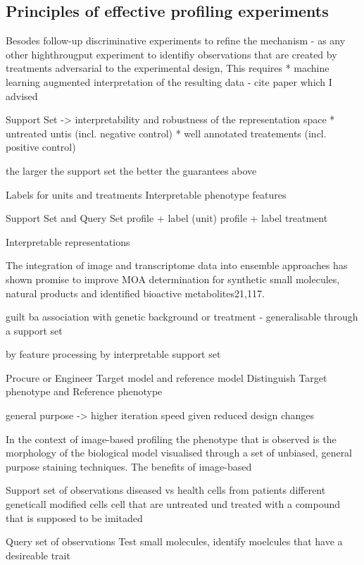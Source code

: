 \begin{flushleft}
\subsection{Principles of effective profiling experiments}

Besodes follow-up discriminative experiments to refine the mechanism - as any other highthrougput experiment to identifiy observations that are created by treatments adversarial to the experimental design, This requires 
* machine learning augmented interpretation of the resulting data - cite paper which I advised

Support Set -> interpretability and robustness of the representation space
* untreated untis (incl. negative control)
* well annotated treatements (incl. positive control)

the larger the support set the better the guarantees above



Labels for units and treatments
Interpretable phenotype features

Support Set and Query Set
profile + label (unit)
profile + label treatment

Interpretable representations

The integration of image and transcriptome data into ensemble approaches has shown promise to improve MOA determination for synthetic small molecules, natural products and identified bioactive metabolites21,117.

guilt ba association with genetic background or treatment - generalisable through a support set 

by feature processing 
by interpretable support set

Procure or Engineer Target model and reference model
Distinguish Target phenotype and Reference phenotype


general purpose -> higher iteration speed given reduced design changes





In the context of image-based profiling the phenotype that is observed is the morphology of the biological model visualised through a set of unbiased, general purpose staining techniques. The benefits of image-based 


Support set of observations
diseased vs health cells from patients
different geneticall modified cells 
cell that are untreated und treated with a compound that is supposed to be imitaded 

Query set of observations
Test small molecules, identify moelcules that have a desireable trait


\end{flushleft}
